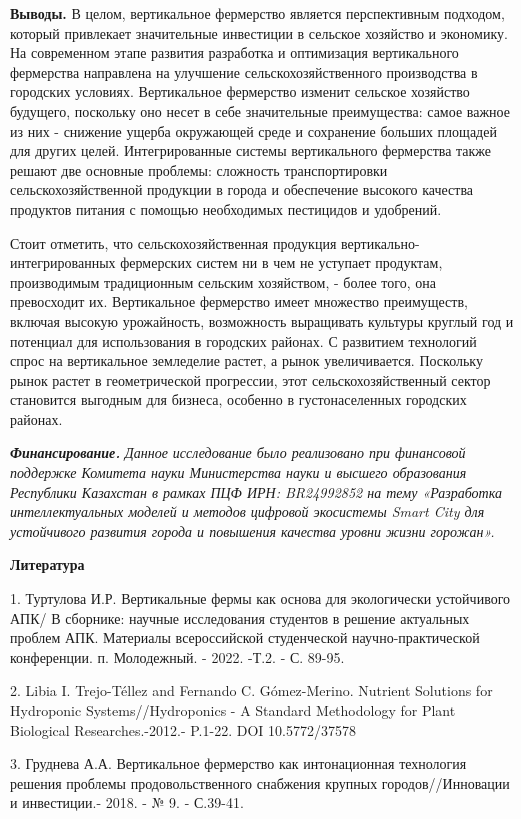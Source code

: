 {\bfseries Выводы.} В целом, вертикальное фермерство является перспективным
подходом, который привлекает значительные инвестиции в сельское
хозяйство и экономику. На современном этапе развития разработка и
оптимизация вертикального фермерства направлена на улучшение
сельскохозяйственного производства в городских условиях. Вертикальное
фермерство изменит сельское хозяйство будущего, поскольку оно несет в
себе значительные преимущества: самое важное из них - снижение ущерба
окружающей среде и сохранение больших площадей для других целей.
Интегрированные системы вертикального фермерства также решают две
основные проблемы: сложность транспортировки сельскохозяйственной
продукции в города и обеспечение высокого качества продуктов питания с
помощью необходимых пестицидов и удобрений.

Стоит отметить, что сельскохозяйственная продукция
вертикально-интегрированных фермерских систем ни в чем не уступает
продуктам, производимым традиционным сельским хозяйством, - более того,
она превосходит их. Вертикальное фермерство имеет множество преимуществ,
включая высокую урожайность, возможность выращивать культуры круглый год
и потенциал для использования в городских районах. С развитием
технологий спрос на вертикальное земледелие растет, а рынок
увеличивается. Поскольку рынок растет в геометрической прогрессии, этот
сельскохозяйственный сектор становится выгодным для бизнеса, особенно в
густонаселенных городских районах.

\emph{{\bfseries Финансирование.}} \emph{Данное исследование было
реализовано при финансовой поддержке Комитета науки Министерства науки и
высшего образования Республики Казахстан в рамках ПЦФ ИРН: BR24992852 на
тему «Разработка интеллектуальных моделей и методов цифровой экосистемы
Smart City для устойчивого развития города и повышения качества уровни
жизни горожан».}

{\bfseries Литература}

1. Туртулова И.Р. Вертикальные фермы как основа для экологически
устойчивого АПК\textsc{/ В} сборнике: научные исследования студентов в
решение актуальных проблем АПК. Материалы всероссийской студенческой
научно-практической конференции. п. Молодежный. - 2022. -Т.2. - С.
89-95.

2. Libia I. Trejo-Téllez and Fernando C. Gómez-Merino. Nutrient Solutions
for Hydroponic Systems//Hydroponics - A Standard Methodology for Plant
Biological Researches.-2012.- P.1-22. DOI 10.5772/37578

3. Груднева А.А. Вертикальное фермерство как интонационная технология
решения проблемы продовольственного снабжения крупных городов//Инновации
и инвестиции.- 2018. - № 9. - С.39-41.

